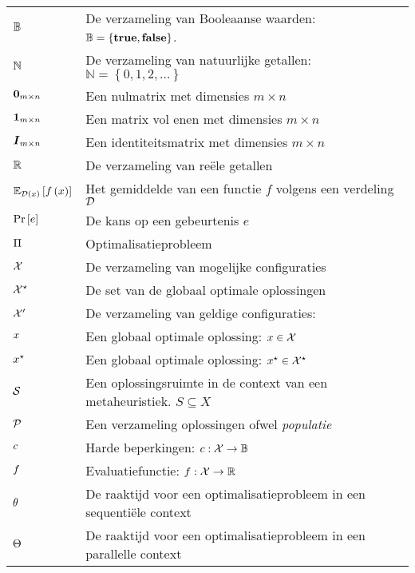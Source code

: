\begin{flushleft}
  \renewcommand{\arraystretch}{1.1}
  \begin{tabularx}{\textwidth}{@{}p{22mm}X@{}}
    $\BoolSet$					& De verzameling van Booleaanse waarden: $\mathbb{B}=\left\{\mbox{\textbf{true}},\mbox{\textbf{false}}\right\}$. \\
    $\NatSet$					& De verzameling van natuurlijke getallen: $\mathbb{N}=\left\{0,1,2,\ldots\right\}$ \\
    $\zeromatrix[m\times n]$			& Een nulmatrix met dimensies $m\times n$\\
    $\onematrix[m\times n]$			& Een matrix vol enen met dimensies $m\times n$\\
    $\identitymatrix[m\times n]$		& Een identiteitsmatrix met dimensies $m\times n$\\
    $\RealSet$					& De verzameling van re\"ele getallen\\
    $\mean[\fun{\calD}{x}]{\fun{f}{x}}$	& Het gemiddelde van een functie $f$ volgens een verdeling $\calD$\\%
    $\Prob{e}$					& De kans op een gebeurtenis $e$\\
    $\OpProblem$				& Optimalisatieprobleem\\
    $\ConfigSet$				& De verzameling van mogelijke configuraties\\
    $\ConfigOpSet$				& De set van de globaal optimale oplossingen\\
    $\ConfigValSet$				& De verzameling van geldige configuraties: \\
    $\sol$					& Een globaal optimale oplossing: $\sol\in\ConfigSet$\\
    $\bestSol$					& Een globaal optimale oplossing: $\xstar\in\ConfigOpSet$\\
    $\SolSet$					& Een oplossingsruimte in de context van een metaheuristiek. $S\subseteq X$\\
    $\PopSet$					& Een verzameling oplossingen ofwel \emph{populatie}\\
    $\hcfun$					& Harde beperkingen: $\funsig{\hcfun}{\ConfigSet}{\BoolSet}$\\
    $\evalfun$					& Evaluatiefunctie: $\funsig{\evalfun}{\ConfigSet}{\RealSet}$\\
    $\hittime$					& De raaktijd voor een optimalisatieprobleem in een sequenti\"ele context\\
    $\phittime$					& De raaktijd voor een optimalisatieprobleem in een parallelle context\\

\end{tabularx}
\end{flushleft}
